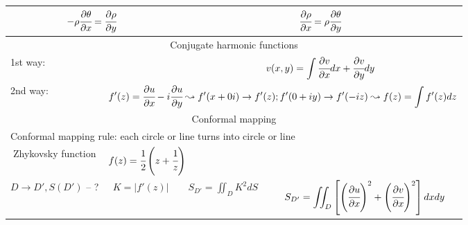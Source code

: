 \begin{tabular}{|cccc|}
	\multicolumn{2}{|c}{$\displaystyle -\rho\cfrac{\partial \theta}{\partial x} = \cfrac{\partial \rho}{\partial y}$} &
	\multicolumn{2}{c|}{$\displaystyle \cfrac{\partial \rho}{\partial x} = \rho \cfrac{\partial \theta}{\partial y}$} \\
	\hline
	
	\multicolumn{4}{|c|}{Conjugate harmonic functions} \\
	\multicolumn{2}{|l}{1st way:} &
	\multicolumn{2}{c|}{$\displaystyle v(x, y) = \int \cfrac{\partial v}{\partial x} dx + \cfrac{\partial v}{\partial y} dy$} \\
	
	\multicolumn{1}{|l}{2nd way:} &
	\multicolumn{3}{c|}{
	$\displaystyle f'(z) = \cfrac{\partial u}{\partial x} -i\cfrac{\partial u}{\partial y} \leadsto
	f'(x + 0i) \rightarrow f'(z); f'(0 + iy) \rightarrow f'(-iz) \leadsto
	f(z) = \int f'(z)dz$} \\
	\hline
	
	\multicolumn{4}{|c|}{Conformal mapping} \\
	
	\multicolumn{4}{|l|}{Conformal mapping rule: each circle or line turns into circle or line} \\
	
	Zhykovsky function &
	\multicolumn{3}{l|}{$\displaystyle f(z) = \cfrac{1}{2}\left( z + \cfrac{1}{z} \right)$} \\
	
	$\displaystyle D \rightarrow D', S(D')$ -- ? &
	$\displaystyle K = |f'(z)|$ &
	$\displaystyle S_{D'} = \iint_{D}K^2dS$ &
	$\displaystyle S_{D'} = \iint_{D}\left[\left(\cfrac{\partial u}{\partial x}\right)^2 + \left(\cfrac{\partial v}{\partial x}\right)^2\right]dxdy$ \\
	\hline
\end{tabular}